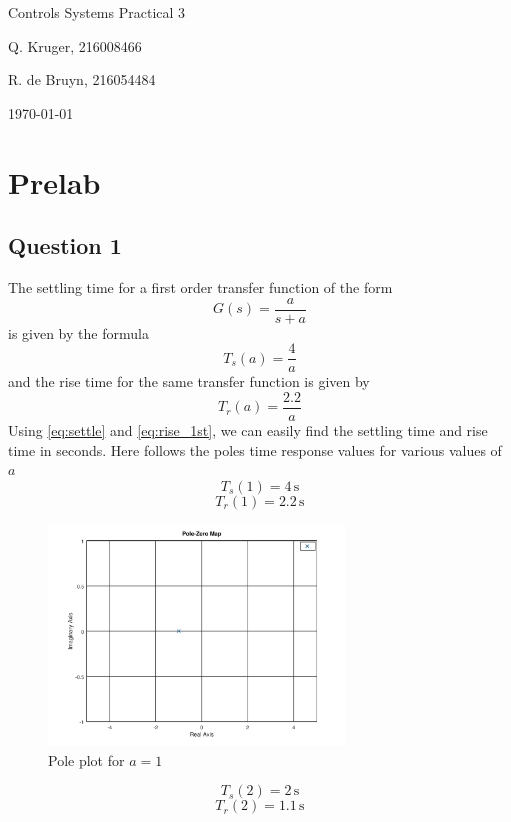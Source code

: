 \documentclass[a4paper, 12pt]{article}
\begin{document}
	\begin{titlepage}
		\centering
		{\LARGE Controls Systems Practical 3 \par}
		\vspace*{1.5cm}
		{\large Q. Kruger, 216008466 \par}
		{\large R. de Bruyn, 216054484 \par}
		\vspace*{1.2cm}
		{\large \today}
		\vspace*{\fill}
		\vspace*{\fill}
	\end{titlepage}

	\tableofcontents
	\listoffigures
	\listoftables
	\newpage

	\section{Prelab} %
	\label{sec:prelab}
		\subsection{Question 1} %
		\label{sub:prelab_question_1}
			The settling time for a first order transfer function of the form
			\[
				G(s) = \frac{a}{s + a}
			\]
			is given by the formula
			\begin{equation}
				T_s(a) = \frac{4}{a}
				\label{eq:settle}
			\end{equation}
			and the rise time for the same transfer function is given by
			\begin{equation}
				T_r(a) = \frac{2.2}{a}
				\label{eq:rise_1st}
			\end{equation}
			Using \eqref{eq:settle} and \eqref{eq:rise_1st}, we can easily find the settling time and rise time in seconds. Here follows the poles time response values for various values of $a$
			\[
				T_s(1) = 4\,\text{s}
			\]
			\[
				T_r(1) = 2.2\,\text{s}
			\]
			\begin{figure}[H]
				\centering
				\includegraphics[width=0.7\textwidth]{img/1st1.png}
				\caption{Pole plot for $a = 1$}
				\label{fig:1}
			\end{figure}
			\[
				T_s(2) = 2\,\text{s}
			\]
			\[
				T_r(2) = 1.1\,\text{s}
			\]
			
\end{document}

